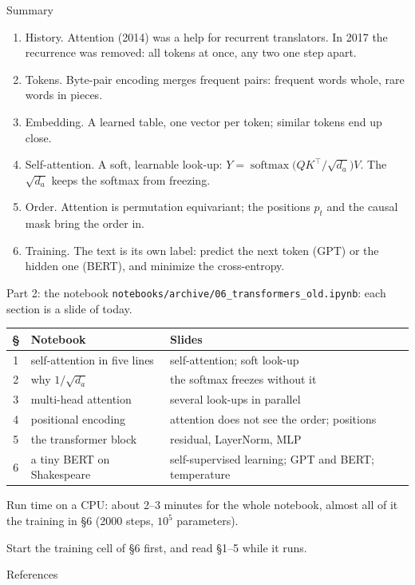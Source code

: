 \documentclass[10pt]{beamer}
\DeclareMathOperator{\softmax}{softmax}
\newcommand{\takeaway}[1]{%
  \par\medskip
  \begin{tcolorbox}[enhanced, colback=ctrl!8, colframe=ctrl, boxrule=0pt, leftrule=2.5pt, arc=0pt,
      left=5pt, right=5pt, top=2.5pt, bottom=2.5pt, before skip=0pt, after skip=0pt]
  \small #1
  \end{tcolorbox}}
\begin{document}
\begin{frame}{Summary}
\small
\begin{enumerate}
\setlength{\itemsep}{3pt}
\item \alert{History.} Attention (2014) was a help for recurrent translators. In 2017 the recurrence was removed: all tokens at once, any two one step apart.
\item \alert{Tokens.} Byte-pair encoding merges frequent pairs: frequent words whole, rare words in pieces.
\item \alert{Embedding.} A learned table, one vector per token; similar tokens end up close.
\item \alert{Self-attention.} A soft, learnable look-up: $Y=\softmax\big(QK^\top/\sqrt{d_a}\big)V$. The $\sqrt{d_a}$ keeps the softmax from freezing.
\item \alert{Order.} Attention is permutation equivariant; the positions $p_t$ and the causal mask bring the order in.
\item \alert{Training.} The text is its own label: predict the next token (GPT) or the hidden one (BERT), and minimize the cross-entropy.
\end{enumerate}
\end{frame}


\begin{frame}{Part 2: the notebook}
\small
\texttt{notebooks/archive/06\_transformers\_old.ipynb}: each section is a slide of today.

\medskip
\footnotesize
\renewcommand{\arraystretch}{1.25}
\begin{tabularx}{\textwidth}{@{}c l >{\raggedright\arraybackslash}X@{}}
\toprule
\textbf{\S} & \textbf{Notebook} & \textbf{Slides} \\
\midrule
1 & self-attention in five lines & self-attention; soft look-up \\
2 & why $1/\sqrt{d_a}$ & the softmax freezes without it \\
3 & multi-head attention & several look-ups in parallel \\
4 & positional encoding & attention does not see the order; positions \\
5 & the transformer block & residual, LayerNorm, MLP \\
6 & a tiny BERT on Shakespeare & self-supervised learning; GPT and BERT; temperature \\
\bottomrule
\end{tabularx}

\medskip
\small
\alert{Run time} on a CPU: about \alert{2--3 minutes} for the whole notebook, almost all of it the training in \S6 (2000 steps, $10^5$ parameters).
\takeaway{Start the training cell of \S6 first, and read \S1--5 while it runs.}
\end{frame}


\begin{frame}[allowframebreaks]{References}
\tiny
\nocite{rush2018,huang2022}


\end{frame}
\end{document}
